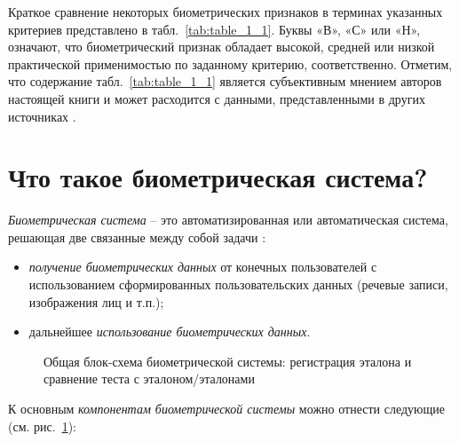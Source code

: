 \documentclass[12pt]{book}
\begin{document}
\large{Краткое сравнение некоторых биометрических признаков в терминах указанных критериев представлено в табл.~\ref{tab:table_1_1}. Буквы «В», «С» или «Н», означают, что биометрический признак обладает высокой, средней или низкой практической применимостью по заданному критерию, соответственно. Отметим, что содержание табл.~\ref{tab:table_1_1} является субъективным мнением авторов настоящей книги и может расходится с данными, представленными в других источниках \cite{tripathi_2011, dahea_2018, rousan_2020}.}

\section{Что такое биометрическая система?}

\large{\textit{Биометрическая система} -- это автоматизированная или автоматическая система, решающая две связанные между собой задачи \cite{kukharev_2013}: 

\begin{itemize}[topsep=1pt] \itemsep0.1em
\item \textit{получение биометрических данных} от конечных пользователей с использованием сформированных пользовательских данных (речевые записи, изображения лиц и т.п.);
\item дальнейшее \textit{использование биометрических данных}.
\end{itemize}

\begin{figure}[h]
\caption{Общая блок-схема биометрической системы: регистрация эталона и сравнение теста с эталоном/эталонами}
\label{fig:figure_1_1}
\end{figure}

К основным \textit{компонентам биометрической системы} можно отнести следующие (см. рис.~\ref{fig:figure_1_1}): 

}
\end{document}
